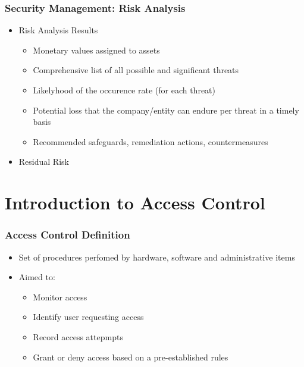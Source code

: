 \documentclass{beamer}
\begin{document}


\begin{frame}
\frametitle{Security Management: Risk Analysis}
\begin{itemize}

\item Risk Analysis Results
  \begin{itemize}
  \item Monetary values assigned to assets
  \item Comprehensive list of all possible and significant threats
  \item Likelyhood of the occurence rate (for each threat)
  \item Potential loss that the company/entity can endure per threat in a timely basis
  \item Recommended safeguards, remediation actions, countermeasures
  \end{itemize}
\item Residual Risk

\end{itemize}

\end{frame}


\section{Introduction to Access Control}
\begin{frame}
\frametitle{Access Control Definition}

\begin{itemize}
\item Set of procedures perfomed by hardware, software and administrative items
\item Aimed to:
   \begin{itemize}
   \item Monitor access
   \item Identify user requesting access
   \item Record access attepmpts
   \item Grant or deny access based on a pre-established rules
   \end{itemize}
\end{itemize}

\end{frame}
\end{document}
